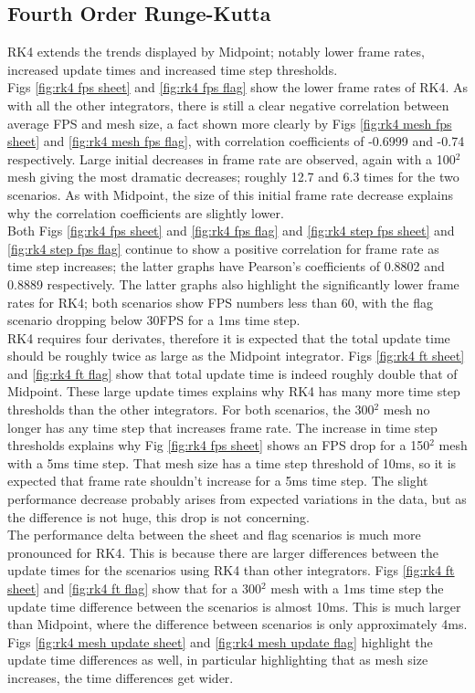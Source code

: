 \subsection{Fourth Order Runge-Kutta}
RK4 extends the trends displayed by Midpoint; notably lower frame rates, increased update times and increased time step thresholds.
\\Figs \ref{fig:rk4 fps sheet} and \ref{fig:rk4 fps flag} show the lower frame rates of RK4. As with all the other integrators, there is still a clear negative correlation between average FPS and mesh size, a fact shown more clearly by Figs \ref{fig:rk4 mesh fps sheet} and \ref{fig:rk4 mesh fps flag}, with correlation coefficients of -0.6999 and -0.74 respectively. Large initial decreases in frame rate are observed, again with a 100$^{2}$ mesh giving the most dramatic decreases; roughly 12.7 and 6.3 times for the two scenarios. As with Midpoint, the size of this initial frame rate decrease explains why the correlation coefficients are slightly lower.
\\Both Figs \ref{fig:rk4 fps sheet} and \ref{fig:rk4 fps flag} and \ref{fig:rk4 step fps sheet} and \ref{fig:rk4 step fps flag} continue to show a positive correlation for frame rate as time step increases; the latter graphs have Pearson's coefficients of 0.8802 and 0.8889 respectively. The latter graphs also highlight the significantly lower frame rates for RK4; both scenarios show FPS numbers less than 60, with the flag scenario dropping below 30FPS for a 1ms time step.
\\RK4 requires four derivates, therefore it is expected that the total update time should be roughly twice as large as the Midpoint integrator. Figs \ref{fig:rk4 ft sheet} and \ref{fig:rk4 ft flag} show that total update time is indeed roughly double that of Midpoint. These large update times explains why RK4 has many more time step thresholds than the other integrators. For both scenarios, the 300$^{2}$ mesh no longer has any time step that increases frame rate. The increase in time step thresholds explains why Fig \ref{fig:rk4 fps sheet} shows an FPS drop for a 150$^{2}$ mesh with a 5ms time step. That mesh size has a time step threshold of 10ms, so it is expected that frame rate shouldn't increase for a 5ms time step. The slight performance decrease probably arises from expected variations in the data, but as the difference is not huge, this drop is not concerning.
\\The performance delta between the sheet and flag scenarios is much more pronounced for RK4. This is because there are larger differences between the update times for the scenarios using RK4 than other integrators. Figs \ref{fig:rk4 ft sheet} and \ref{fig:rk4 ft flag} show that for a 300$^{2}$ mesh with a 1ms time step the update time difference between the scenarios is almost 10ms. This is much larger than Midpoint, where the difference between scenarios is only approximately 4ms. Figs \ref{fig:rk4 mesh update sheet} and \ref{fig:rk4 mesh update flag} highlight the update time differences as well, in particular highlighting that as mesh size increases, the time differences get wider.
